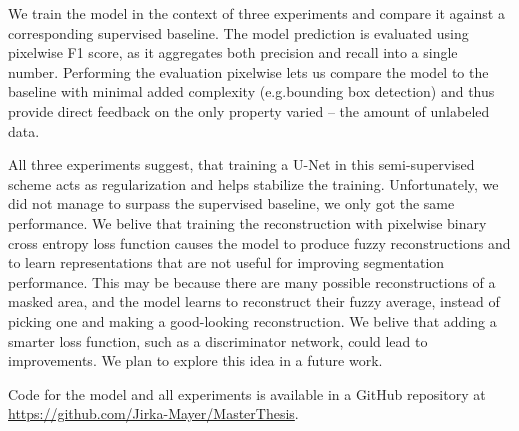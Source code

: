 We train the model in the context of three experiments and compare it against a corresponding supervised baseline. The model prediction is evaluated using pixelwise F1 score, as it aggregates both precision and recall into a single number. Performing the evaluation pixelwise lets us compare the model to the baseline with minimal added complexity (e.g.\@ bounding box detection) and thus provide direct feedback on the only property varied -- the amount of unlabeled data.

All three experiments suggest, that training a U-Net in this semi-supervised scheme acts as regularization and helps stabilize the training. Unfortunately, we did not manage to surpass the supervised baseline, we only got the same performance. We belive that training the reconstruction with pixelwise binary cross entropy loss function causes the model to produce fuzzy reconstructions and to learn representations that are not useful for improving segmentation performance. This may be because there are many possible reconstructions of a masked area, and the model learns to reconstruct their fuzzy average, instead of picking one and making a good-looking reconstruction. We belive that adding a smarter loss function, such as a discriminator network, could lead to improvements. We plan to explore this idea in a future work.




Code for the model and all experiments is available in a GitHub repository at \url{https://github.com/Jirka-Mayer/MasterThesis}.
